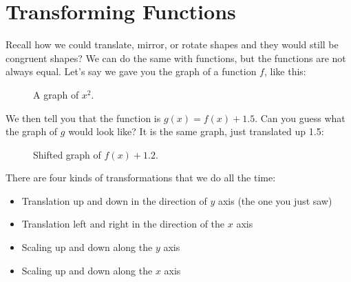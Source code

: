 \chapter{Transforming Functions}
Recall how we could translate, mirror, or rotate shapes and they would still be congruent shapes? We can do the same with functions, but the functions are not always equal.
Let's say we gave you the graph of a function $f$, like this:
\begin{figure}[htbp]
    \centering
    \caption{A graph of $x^2$.}
    \label{fig:graphNoShift}
\end{figure}

We then tell you that the function is $g(x) = f(x) + 1.5$.  Can you guess what the graph of $g$ would look like? It is the same graph, just translated up 1.5:
\begin{figure}[htbp]
    \centering


    \caption{Shifted graph of $f(x) + 1.2$.}
    \label{fig:example}
\end{figure}


There are four kinds of transformations that we do all the time:
\begin{itemize}
\item Translation up and down in the direction of $y$ axis (the one you just saw)
\item Translation left and right in the direction of the $x$ axis
\item Scaling up and down along the $y$ axis
\item Scaling up and down along the $x$ axis
\end{itemize}

